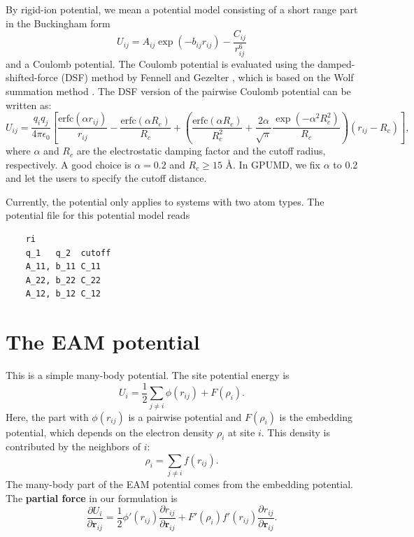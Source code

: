 \documentclass[12pt,a4paper]{report}
\newcommand{\vect}[1]{\boldsymbol{#1}}
\begin{document}
By rigid-ion potential, we mean a potential model consisting of a short range part in the Buckingham form
\begin{equation}
U_{ij} = A_{ij} \exp\left( - b_{ij} r_{ij} \right)
- \frac{C_{ij} }{ r_{ij}^{6} }
\end{equation}
and a Coulomb potential. The Coulomb potential is evaluated using the damped-shifted-force (DSF) method by Fennell and Gezelter \cite{fennell2006jcp}, which is based on the Wolf summation method \cite{wolf1999jcp}. The DSF version of the pairwise Coulomb potential can be written as:
\begin{equation}
U_{ij} = \frac{q_iq_j}{4\pi\epsilon_0}
\left[
\frac{\text{erfc}(\alpha r_{ij})}{r_{ij}} -
\frac{\text{erfc}(\alpha R_{c})}{R_{c}} +
  \left(
    \frac{\text{erfc}(\alpha R_{c})}{R_{c}^2} +
    \frac{2\alpha}{\sqrt{\pi}}
    \frac{\exp(-\alpha^2R_c^2)}{R_{c}}
  \right) (r_{ij} - R_c)
\right],
\end{equation}
where $\alpha$ and $R_c$ are the electrostatic damping factor and the cutoff radius, respectively.
A good choice is $\alpha=0.2$ and $R_c \geq 15$ \AA. In GPUMD, we fix $\alpha$  to 0.2 and let the users to specify the cutoff distance.

Currently, the potential only applies to systems with two atom types. The potential file for this potential model reads
\begin{verbatim}
    ri
    q_1   q_2  cutoff
    A_11, b_11 C_11
    A_22, b_22 C_22
    A_12, b_12 C_12
\end{verbatim}


\section{The EAM potential}

This is a simple many-body potential. The site potential energy is
\begin{equation}
U_i = \frac{1}{2} \sum_{j\neq i} \phi(r_{ij}) + F (\rho_i).
\end{equation}
Here, the part with $\phi(r_{ij})$ is a pairwise potential and $F(\rho_i)$ is the embedding potential, which depends on the electron density $\rho_i$ at site $i$. This density is contributed by the neighbors of $i$:
\begin{equation}
\rho_i = \sum_{j\neq i} f(r_{ij}).
\end{equation}
The many-body part of the EAM potential comes from the embedding potential. The \textbf{partial force} in our formulation is
\begin{equation}
\frac{\partial U_i}{\partial \vect{r}_{ij}}
= \frac{1}{2}  \phi'(r_{ij})  \frac{\partial r_{ij}} {\partial \vect{r}_{ij}} +
F'(\rho_i)  f'(r_{ij}) \frac{\partial r_{ij}} {\partial \vect{r}_{ij}}.
\end{equation}
\end{document}
